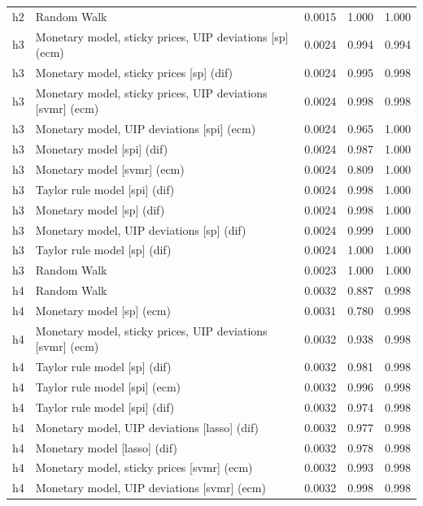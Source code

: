\begin{ThreePartTable}
\begin{longtable}[t]{cp{5.5cm}ccc}
h2 & \raggedright Random Walk & 0.0015 & 1.000 & 1.000\\
\addlinespace
h3 & \raggedright Monetary model, sticky prices, UIP deviations [sp] (ecm) & 0.0024 & 0.994 & 0.994\\
h3 & \raggedright Monetary model, sticky prices [sp] (dif) & 0.0024 & 0.995 & 0.998\\
h3 & \raggedright Monetary model, sticky prices, UIP deviations [svmr] (ecm) & 0.0024 & 0.998 & 0.998\\
h3 & \raggedright Monetary model, UIP deviations [spi] (ecm) & 0.0024 & 0.965 & 1.000\\
h3 & \raggedright Monetary model [spi] (dif) & 0.0024 & 0.987 & 1.000\\
h3 & \raggedright Monetary model [svmr] (ecm) & 0.0024 & 0.809 & 1.000\\
h3 & \raggedright Taylor rule model [spi] (dif) & 0.0024 & 0.998 & 1.000\\
h3 & \raggedright Monetary model [sp] (dif) & 0.0024 & 0.998 & 1.000\\
h3 & \raggedright Monetary model, UIP deviations [sp] (dif) & 0.0024 & 0.999 & 1.000\\
h3 & \raggedright Taylor rule model [sp] (dif) & 0.0024 & 1.000 & 1.000\\
h3 & \raggedright Random Walk & 0.0023 & 1.000 & 1.000\\
\addlinespace
h4 & \raggedright Random Walk & 0.0032 & 0.887 & 0.998\\
h4 & \raggedright Monetary model [sp] (ecm) & 0.0031 & 0.780 & 0.998\\
h4 & \raggedright Monetary model, sticky prices, UIP deviations [svmr] (ecm) & 0.0032 & 0.938 & 0.998\\
h4 & \raggedright Taylor rule model [sp] (dif) & 0.0032 & 0.981 & 0.998\\
h4 & \raggedright Taylor rule model [spi] (ecm) & 0.0032 & 0.996 & 0.998\\
h4 & \raggedright Taylor rule model [spi] (dif) & 0.0032 & 0.974 & 0.998\\
h4 & \raggedright Monetary model, UIP deviations [lasso] (dif) & 0.0032 & 0.977 & 0.998\\
h4 & \raggedright Monetary model [lasso] (dif) & 0.0032 & 0.978 & 0.998\\
h4 & \raggedright Monetary model, sticky prices [svmr] (ecm) & 0.0032 & 0.993 & 0.998\\
h4 & \raggedright Monetary model, UIP deviations [svmr] (ecm) & 0.0032 & 0.998 & 0.998\\

\end{longtable}
\end{ThreePartTable}
